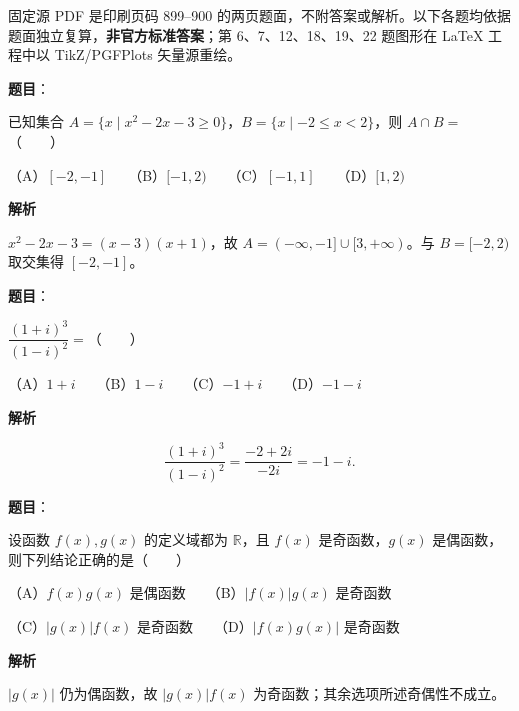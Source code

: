 

\begin{gktip}
固定源 PDF 是印刷页码 899–900 的两页题面，不附答案或解析。以下各题均依据题面独立复算，\textbf{非官方标准答案}；第 6、7、12、18、19、22 题图形在 LaTeX 工程中以 TikZ/PGFPlots 矢量源重绘。
\end{gktip}


\begin{answer}

\textbf{题目}：

已知集合 $A=\{x\mid x^2-2x-3\geqslant0\}$，$B=\{x\mid-2\leqslant x<2\}$，则 $A\cap B=$\mbox{（　　）}

（A）$[-2,-1]$　　（B）$[-1,2)$　　（C）$[-1,1]$　　（D）$[1,2)$

\textbf{解析}

$x^2-2x-3=(x-3)(x+1)$，故 $A=(-\infty,-1]\cup[3,+\infty)$。与 $B=[-2,2)$ 取交集得 $[-2,-1]$。


\end{answer}
\begin{answer}

\textbf{题目}：

$\dfrac{(1+i)^3}{(1-i)^2}=$\mbox{（　　）}

（A）$1+i$　　（B）$1-i$　　（C）$-1+i$　　（D）$-1-i$

\textbf{解析}

\nopagebreak[4]
\[
\frac{(1+i)^3}{(1-i)^2}=\frac{-2+2i}{-2i}=-1-i.
\]


\end{answer}
\begin{answer}

\textbf{题目}：

设函数 $f(x),g(x)$ 的定义域都为 $\mathbb R$，且 $f(x)$ 是奇函数，$g(x)$ 是偶函数，则下列结论正确的是\mbox{（　　）}

（A）$f(x)g(x)$ 是偶函数　　（B）$|f(x)|g(x)$ 是奇函数

（C）$|g(x)|f(x)$ 是奇函数　　（D）$|f(x)g(x)|$ 是奇函数

\textbf{解析}

$|g(x)|$ 仍为偶函数，故 $|g(x)|f(x)$ 为奇函数；其余选项所述奇偶性不成立。


\end{answer}
